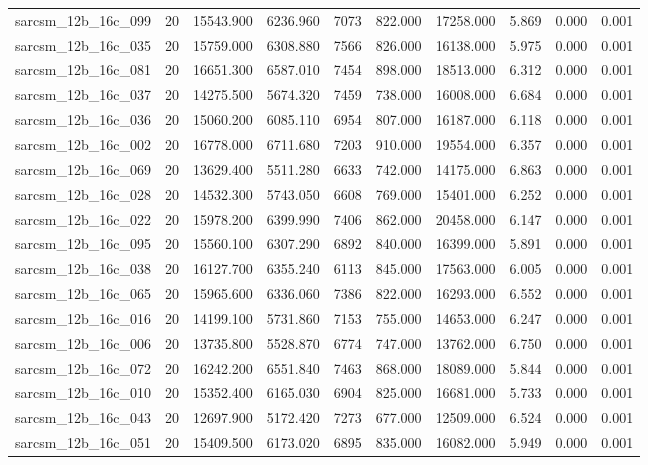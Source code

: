 \begin{tabular}{lrrrrrrrrr}
sarcsm\_12b\_16c\_099 & 20 & 15543.900 & 6236.960 & 7073 & 822.000 & 17258.000 & 5.869 & 0.000 & 0.001 \\
sarcsm\_12b\_16c\_035 & 20 & 15759.000 & 6308.880 & 7566 & 826.000 & 16138.000 & 5.975 & 0.000 & 0.001 \\
sarcsm\_12b\_16c\_081 & 20 & 16651.300 & 6587.010 & 7454 & 898.000 & 18513.000 & 6.312 & 0.000 & 0.001 \\
sarcsm\_12b\_16c\_037 & 20 & 14275.500 & 5674.320 & 7459 & 738.000 & 16008.000 & 6.684 & 0.000 & 0.001 \\
sarcsm\_12b\_16c\_036 & 20 & 15060.200 & 6085.110 & 6954 & 807.000 & 16187.000 & 6.118 & 0.000 & 0.001 \\
sarcsm\_12b\_16c\_002 & 20 & 16778.000 & 6711.680 & 7203 & 910.000 & 19554.000 & 6.357 & 0.000 & 0.001 \\
sarcsm\_12b\_16c\_069 & 20 & 13629.400 & 5511.280 & 6633 & 742.000 & 14175.000 & 6.863 & 0.000 & 0.001 \\
sarcsm\_12b\_16c\_028 & 20 & 14532.300 & 5743.050 & 6608 & 769.000 & 15401.000 & 6.252 & 0.000 & 0.001 \\
sarcsm\_12b\_16c\_022 & 20 & 15978.200 & 6399.990 & 7406 & 862.000 & 20458.000 & 6.147 & 0.000 & 0.001 \\
sarcsm\_12b\_16c\_095 & 20 & 15560.100 & 6307.290 & 6892 & 840.000 & 16399.000 & 5.891 & 0.000 & 0.001 \\
sarcsm\_12b\_16c\_038 & 20 & 16127.700 & 6355.240 & 6113 & 845.000 & 17563.000 & 6.005 & 0.000 & 0.001 \\
sarcsm\_12b\_16c\_065 & 20 & 15965.600 & 6336.060 & 7386 & 822.000 & 16293.000 & 6.552 & 0.000 & 0.001 \\
sarcsm\_12b\_16c\_016 & 20 & 14199.100 & 5731.860 & 7153 & 755.000 & 14653.000 & 6.247 & 0.000 & 0.001 \\
sarcsm\_12b\_16c\_006 & 20 & 13735.800 & 5528.870 & 6774 & 747.000 & 13762.000 & 6.750 & 0.000 & 0.001 \\
sarcsm\_12b\_16c\_072 & 20 & 16242.200 & 6551.840 & 7463 & 868.000 & 18089.000 & 5.844 & 0.000 & 0.001 \\
sarcsm\_12b\_16c\_010 & 20 & 15352.400 & 6165.030 & 6904 & 825.000 & 16681.000 & 5.733 & 0.000 & 0.001 \\
sarcsm\_12b\_16c\_043 & 20 & 12697.900 & 5172.420 & 7273 & 677.000 & 12509.000 & 6.524 & 0.000 & 0.001 \\
sarcsm\_12b\_16c\_051 & 20 & 15409.500 & 6173.020 & 6895 & 835.000 & 16082.000 & 5.949 & 0.000 & 0.001 \\

\end{tabular}
